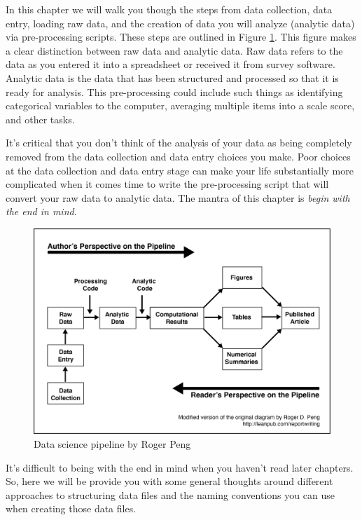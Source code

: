 \documentclass[
]{krantz}
\begin{document}
In this chapter we will walk you though the steps from data collection, data entry, loading raw data, and the creation of data you will analyze (analytic data) via pre-processing scripts. These steps are outlined in Figure \ref{fig:pipeline}. This figure makes a clear distinction between raw data and analytic data. Raw data refers to the data as you entered it into a spreadsheet or received it from survey software. Analytic data is the data that has been structured and processed so that it is ready for analysis. This pre-processing could include such things as identifying categorical variables to the computer, averaging multiple items into a scale score, and other tasks.

It's critical that you don't think of the analysis of your data as being completely removed from the data collection and data entry choices you make. Poor choices at the data collection and data entry stage can make your life substantially more complicated when it comes time to write the pre-processing script that will convert your raw data to analytic data. The mantra of this chapter is \emph{begin with the end in mind}.

\begin{figure}
\includegraphics[width=0.85\linewidth]{ch_enter_load/images/pipeline} \caption{Data science pipeline by Roger Peng}\label{fig:pipeline}
\end{figure}

It's difficult to being with the end in mind when you haven't read later chapters. So, here we will be provide you with some general thoughts around different approaches to structuring data files and the naming conventions you can use when creating those data files.
\end{document}
